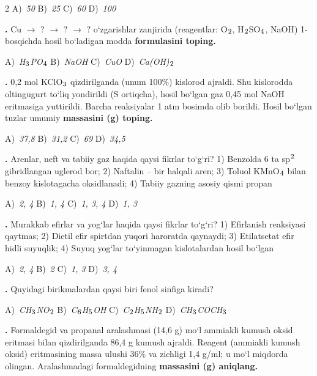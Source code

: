 \documentclass[11pt,a4paper]{article}
\renewcommand{\textsubscript}[1]{\ensuremath{_{\text{\fontsize{8}{8}\selectfont #1}}}}
\renewcommand{\textsuperscript}[1]{\ensuremath{^{\text{\fontsize{8}{8}\selectfont #1}}}}
\newcommand{\qn}[1]{\textbf{\fontsize{11.5}{13}\selectfont #1}}
\newcommand{\qsep}{\par\vspace{13pt}}
\begin{document}
\begin{multicols}{2}
\noindent A)~\textsl{50} \hfill B)~\textsl{25} \hfill C)~\textsl{60} \hfill D)~\textsl{100}\par
\qsep
\noindent\qn{18.} Cu $\to$ ? $\to$ ? $\to$ ? o`zgarishlar zanjirida (reagentlar: O\textsubscript{2}, H\textsubscript{2}SO\textsubscript{4}, NaOH) 1-bosqichda hosil bo`ladigan modda \textbf{formulasini toping.}

\noindent A)~\textsl{H\textsubscript{3}PO\textsubscript{4}} \hfill B)~\textsl{NaOH} \hfill C)~\textsl{CuO} \hfill D)~\textsl{Ca(OH)\textsubscript{2}}\par
\qsep
\noindent\qn{19.} 0,2 mol KClO\textsubscript{3} qizdirilganda (unum 100\%) kislorod ajraldi. Shu kislorodda oltingugurt to`liq yondirildi (S ortiqcha), hosil bo`lgan gaz 0,45 mol NaOH eritmasiga yuttirildi. Barcha reaksiyalar 1 atm bosimda olib borildi. Hosil bo`lgan tuzlar umumiy \textbf{massasini (g) toping.}

\noindent A)~\textsl{37,8} \hfill B)~\textsl{31,2} \hfill C)~\textsl{69} \hfill D)~\textsl{34,5}\par
\qsep
\noindent\qn{20.} Arenlar, neft va tabiiy gaz haqida qaysi fikrlar to`g`ri? 1) Benzolda 6 ta sp\textsuperscript{2} gibridlangan uglerod bor; 2) Naftalin -- bir halqali aren; 3) Toluol KMnO\textsubscript{4} bilan benzoy kislotagacha oksidlanadi; 4) Tabiiy gazning asosiy qismi propan

\noindent A)~\textsl{2, 4} \hfill B)~\textsl{1, 4} \hfill C)~\textsl{1, 3, 4} \hfill D)~\textsl{1, 3}\par
\qsep
\noindent\qn{21.} Murakkab efirlar va yog`lar haqida qaysi fikrlar to`g`ri? 1) Efirlanish reaksiyasi qaytmas; 2) Dietil efir spirtdan yuqori haroratda qaynaydi; 3) Etilatsetat efir hidli suyuqlik; 4) Suyuq yog`lar to`yinmagan kislotalardan hosil bo`lgan

\noindent A)~\textsl{2, 4} \hfill B)~\textsl{2} \hfill C)~\textsl{1, 3} \hfill D)~\textsl{3, 4}\par
\qsep
\noindent\qn{22.} Quyidagi birikmalardan qaysi biri fenol sinfiga kiradi?

\noindent A)~\textsl{CH\textsubscript{3}NO\textsubscript{2}} \hfill B)~\textsl{C\textsubscript{6}H\textsubscript{5}OH} \hfill C)~\textsl{C\textsubscript{2}H\textsubscript{5}NH\textsubscript{2}} \hfill D)~\textsl{CH\textsubscript{3}COCH\textsubscript{3}}\par
\qsep
\noindent\qn{23.} Formaldegid va propanal aralashmasi (14,6 g) mo`l ammiakli kumush oksid eritmasi bilan qizdirilganda 86,4 g kumush ajraldi. Reagent (ammiakli kumush oksid) eritmasining massa ulushi 36\% va zichligi 1,4 g/ml; u mo`l miqdorda olingan. Aralashmadagi formaldegidning \textbf{massasini (g) aniqlang.}


\end{multicols}
\end{document}
